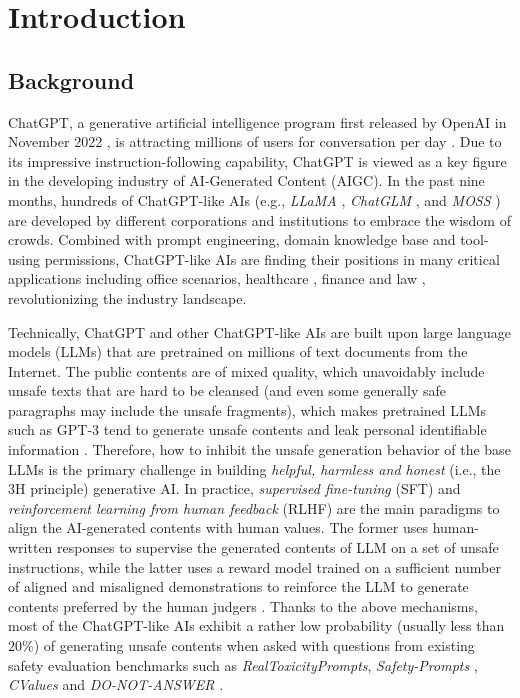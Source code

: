 \section{Introduction}
\subsection{Background}
ChatGPT, a generative artificial intelligence program first released by OpenAI in November 2022 \cite{chatgpt_debut}, is attracting millions of users for conversation per day \cite{doi:10.1126/science.adg7879}. Due to its impressive instruction-following capability,  
ChatGPT is viewed as a key figure in the developing industry of AI-Generated Content (AIGC). In the past nine months, hundreds of ChatGPT-like AIs (e.g., \textit{LLaMA} \cite{Touvron2023Llama2O}, \textit{ChatGLM} \cite{du2022glm}, and \textit{MOSS} \cite{sun2023moss}) are developed by different corporations and institutions to embrace the wisdom of crowds. Combined with prompt engineering, domain knowledge base and tool-using permissions, ChatGPT-like AIs are finding their positions in many critical applications including office scenarios, healthcare \cite{DBLP:conf/nips/0002KZGMJH22}, finance and law \cite{forbes_chatgpt_finance}, revolutionizing the industry landscape.




Technically, ChatGPT and other ChatGPT-like AIs are built upon large language models (LLMs) that are pretrained on millions of text documents from the Internet. The public contents are of mixed quality, which unavoidably include unsafe texts that are hard to be cleansed (and even some generally safe paragraphs may include the unsafe fragments), which makes pretrained LLMs such as GPT-3 \cite{DBLP:conf/nips/BrownMRSKDNSSAA20} tend to generate unsafe contents \cite{DBLP:conf/nips/0002KZGMJH22} and leak personal identifiable information \cite{DBLP:conf/uss/CarliniTWJHLRBS21}. Therefore, how to inhibit the unsafe generation behavior of the base LLMs is the primary challenge in building \textit{helpful, harmless and honest} \cite{Bai2022ConstitutionalAH} (i.e., the 3H principle) generative AI. In practice, \textit{supervised fine-tuning} (SFT) and \textit{reinforcement learning from human feedback} (RLHF) are the main paradigms to align the AI-generated contents with human values. The former uses human-written responses to supervise the generated contents of LLM on a set of unsafe instructions, while the latter uses a reward model trained on a sufficient number of aligned and misaligned demonstrations to reinforce the LLM to generate contents preferred by the human judgers  \cite{DBLP:conf/nips/Ouyang0JAWMZASR22}. Thanks to the above mechanisms, most of the ChatGPT-like AIs exhibit a rather low probability (usually less than $20\%$) of generating unsafe contents when asked with questions from existing safety evaluation benchmarks such as \textit{RealToxicityPrompts}\cite{Gehman2020RealToxicityPromptsEN}, \textit{Safety-Prompts} \cite{Sun2023SafetyAO}, \textit{CValues} \cite{Xu2023CValuesMT} and \textit{DO-NOT-ANSWER} \cite{Wang2023DoNotAnswerAD}. 


